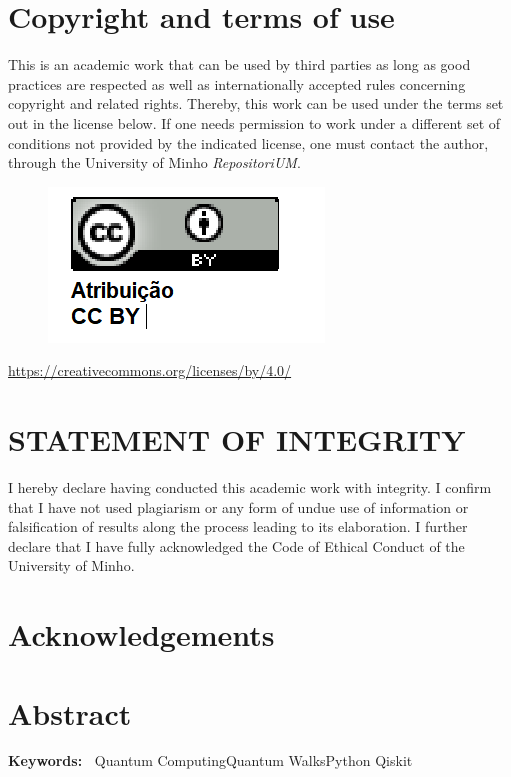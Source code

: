 \documentclass[
oneside,
11pt, a4paper,
footinclude=true,
headinclude=true,
cleardoublepage=empty
]{scrbook}
\author{Jaime Pereira Santos}
\date{\myear} %
\newcommand\englishkeywordslabel{Keywords:}
\newcommand\englishkeywords[1]{%
  \begin{list}{}{%
    \setlength{\topsep}{2ex}%
    \settowidth{\leftmargin}{\bfseries\englishkeywordslabel~}%
    \setlength{\labelsep}{0pt}%
    \setlength{\labelwidth}{\leftmargin}%
    \setlength{\itemindent}{0pt}%
  }
  \raggedright\bfseries\item[\bfseries\englishkeywordslabel~]#1
  \end{list}
}
\begin{document}
\umfrontcover	
\umtitlepage

\chapter*{Copyright and terms of use}
This is an academic work that can be used by third parties as long as good practices are
respected as well as internationally accepted rules concerning copyright and related rights.
Thereby, this work can be used under the terms set out in the license below.
If one needs permission to work under a different set of conditions not provided by the
indicated license, one must contact the author, through the University of Minho \textit{RepositoriUM}.
\begin{figure}[!h]
    \centering
    \includegraphics[scale=0.7]{img/CopyrightImg.png}
    \raggedright
\end{figure}\par
\url{https://creativecommons.org/licenses/by/4.0/}

\chapter*{STATEMENT OF INTEGRITY}
I hereby declare having conducted this academic work with integrity. I confirm that I have not used plagiarism or any form of undue use of information or falsification of results along the process leading to its elaboration. 
I further declare that I have fully acknowledged the Code of Ethical Conduct of the University of Minho.

\chapter*{Acknowledgements}


\chapter*{Abstract}

\englishkeywords{Quantum Computing\quad Quantum Walks\quad Python \quad Qiskit}
\end{document}
